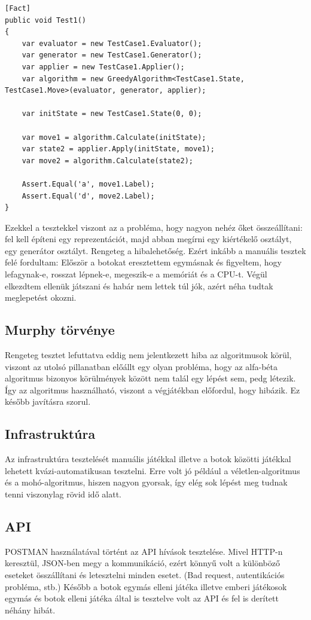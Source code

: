 \documentclass[twoside, a4paper, 12pt]{book}
\begin{document}
\begin{lstlisting}[caption=Mohó-algoritmus teszt, label=lst:greedy_test, float]
[Fact]
public void Test1()
{
	var evaluator = new TestCase1.Evaluator();
	var generator = new TestCase1.Generator();
	var applier = new TestCase1.Applier();
	var algorithm = new GreedyAlgorithm<TestCase1.State, TestCase1.Move>(evaluator, generator, applier);
	
	var initState = new TestCase1.State(0, 0);
	
	var move1 = algorithm.Calculate(initState);
	var state2 = applier.Apply(initState, move1);
	var move2 = algorithm.Calculate(state2);
	
	Assert.Equal('a', move1.Label);
	Assert.Equal('d', move2.Label);
}
\end{lstlisting}

Ezekkel a tesztekkel viszont az a probléma, hogy nagyon nehéz őket összeállítani: fel kell építeni egy reprezentációt, majd abban megírni egy kiértékelő osztályt, egy generátor osztályt. Rengeteg a hibalehetőség. Ezért inkább a manuális tesztek felé fordultam:
Először a botokat eresztettem egymásnak és figyeltem, hogy lefagynak-e, rosszat lépnek-e, megeszik-e a memóriát és a CPU-t. Végül elkezdtem ellenük játszani és habár nem lettek túl jók, azért néha tudtak meglepetést okozni.

\subsection{Murphy törvénye}
Rengeteg tesztet lefuttatva eddig nem jelentkezett hiba az algoritmusok körül, viszont az utolsó pillanatban előállt egy olyan probléma, hogy az alfa-béta algoritmus bizonyos körülmények között nem talál egy lépést sem, pedg létezik. Így az algoritmus használható, viszont a végjátékban előfordul, hogy hibázik. Ez később javításra szorul.


\subsection{Infrastruktúra}
Az infrastruktúra tesztelését manuális játékkal illetve a botok közötti játékkal lehetett kvázi-automatikusan tesztelni. Erre volt jó például a véletlen-algoritmus és a mohó-algoritmus, hiszen nagyon gyorsak, így elég sok lépést meg tudnak tenni viszonylag rövid idő alatt.


\subsection{API}
POSTMAN használatával történt az API hívások tesztelése. Mivel HTTP-n keresztül, JSON-ben megy a kommunikáció, ezért könnyű volt a különböző eseteket összállítani és letesztelni minden esetet. (Bad request, autentikációs probléma, stb.) Később a botok egymás elleni játéka illetve emberi játékosok egymás és botok elleni játéka által is tesztelve volt az API és fel is derített néhány hibát.
\end{document}
